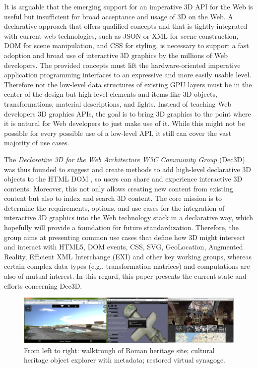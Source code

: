 \documentclass{acmsiggraph}
\begin{document}
It is arguable that the emerging support for an imperative 3D API for the Web is useful but insufficient for broad acceptance and usage of 3D on the Web. A declarative approach that offers qualified concepts and that is tightly integrated with current web technologies, such as JSON or XML for scene construction, DOM for scene manipulation, and CSS for styling, is necessary to support a fast adoption and broad use of interactive 3D graphics by the millions of Web developers. The provided concepts must lift the hardware-oriented imperative application programming interfaces to an expressive and more easily usable level. Therefore not the low-level data structures of existing GPU layers must be in the center of the design but high-level elements and items like 3D objects, transformations, material descriptions, and lights. Instead of teaching Web developers 3D graphics APIs, the goal is to bring 3D graphics to the point where it is natural for Web developers to just make use of it. While this might not be possible for every possible use of a low-level API, it still can cover the vast majority of use cases.

The \textit{Declarative 3D for the Web Architecture W3C Community Group} (Dec3D) \cite{Dec3D} was thus founded to suggest and create methods to add high-level declarative 3D objects to the HTML DOM \cite{W3C-DOM}, so users can share and experience interactive 3D contents. Moreover, this not only allows creating new content from existing content but also to index and search 3D content.
The core mission is to determine the requirements, options, and use cases for the integration of interactive 3D graphics into the Web technology stack in a declarative way, which hopefully will provide a foundation for future standardization.
Therefore, the group aims at presenting common use cases that define how 3D might intersect and interact with HTML5, DOM events, CSS, SVG, GeoLocation, Augmented Reality, Efficient XML Interchange (EXI) \cite{EXI} and other key working groups, whereas certain complex data types (e.g., transformation matrices) and computations are also of mutual interest. In this regard, this paper presents the current state and efforts concerning Dec3D.

\begin{figure}%
  \centering
  \includegraphics[width=1.0\textwidth]{images/ch_apps.png}
  \caption{From left to right: walktrough of Roman heritage site; cultural heritage object explorer with metadata; restored virtual synagoge.}
  \label{fig:chApps}
  \vspace{-0.2cm}
\end{figure}
\end{document}
